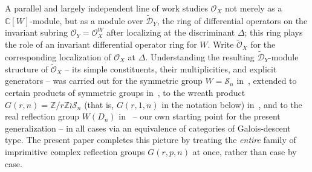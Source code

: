 \documentclass[11pt,a4paper]{article}
\begin{document}
A parallel and largely independent line of work studies
$\mathcal{O}_X$ not merely as a $\mathbb{C}[W]$-module, but as a
module over $\widetilde{\mathcal{D}}_Y$, the ring of differential
operators on the invariant subring $\mathcal{O}_Y = \mathcal{O}_X^W$
after localizing at the discriminant $\Delta$; this ring plays the
role of an invariant differential operator ring for $W$. Write
$\widetilde{\mathcal{O}}_X$ for the corresponding localization of
$\mathcal{O}_X$ at $\Delta$. Understanding the resulting
$\widetilde{\mathcal{D}}_Y$-module structure of $\widetilde{\mathcal{O}}_X$
-- its simple constituents, their multiplicities, and explicit
generators -- was carried out for the symmetric group $W = \mathcal{S}_n$
in~\cite{Nonkane2019}, extended to certain products of symmetric
groups in~\cite{NonkaneTodjihounde2023}, to the wreath product
$G(r,n) = \mathbb{Z}/r\mathbb{Z} \wr \mathcal{S}_n$ (that is, $G(r,1,n)$
in the notation below) in~\cite{NonkaneLawson2022}, and to the real
reflection group $W(D_n)$ in~\cite{NonkaneLawson2021} -- our own
starting point for the present generalization -- in all cases via
an equivalence of categories of Galois-descent type. The present paper
completes this picture by treating the \emph{entire} family of
imprimitive complex reflection groups $G(r,p,n)$ at once, rather than
case by case.
\end{document}
